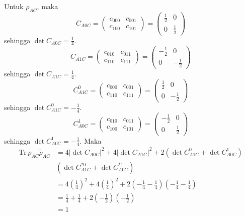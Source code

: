 Untuk $\rho_{AC}$, maka
\begin{equation}
	C_{A0C}=
	\begin{pmatrix}
		c_{000} & c_{001} \\
		c_{100} & c_{101}
	\end{pmatrix}=
	\begin{pmatrix}
		\frac{1}{2} & 0 \\
		0 & \frac{1}{2}
	\end{pmatrix}
\end{equation}
sehingga $\det C_{A0C} = \frac{1}{4}$.
\begin{equation}
	C_{A1C}=
	\begin{pmatrix}
		c_{010} & c_{011} \\
		c_{110} & c_{111}
	\end{pmatrix}=
	\begin{pmatrix}
		-\frac{1}{2} & 0 \\
		0 & -\frac{1}{2}
	\end{pmatrix}
\end{equation}
sehingga $\det C_{A1C} = \frac{1}{4}$.
\begin{equation}
	C_{A1C}^0=
	\begin{pmatrix}
		c_{000} & c_{001} \\
		c_{110} & c_{111}
	\end{pmatrix}=
	\begin{pmatrix}
		\frac{1}{2} & 0 \\
		0 & -\frac{1}{2}
	\end{pmatrix}
\end{equation}
sehingga $\det C_{A1C}^0 = -\frac{1}{4}$.
\begin{equation}
	C_{A0C}^1=
	\begin{pmatrix}
		c_{010} & c_{011} \\
		c_{100} & c_{101}
	\end{pmatrix}=
	\begin{pmatrix}
		-\frac{1}{2} & 0 \\
		0 & \frac{1}{2}
	\end{pmatrix}
\end{equation}
sehingga $\det C_{A0C}^1 = -\frac{1}{4}$. Maka
\begin{equation}
	\begin{aligned}
		\mathrm{Tr}\,\rho_{AC}\tilde{\rho}_{AC}
		&=4|\det C_{A0C}|^2+4|\det C_{A1C}|^2+2(\det C_{A1C}^0+ \det C_{A0C}^1)\\
		&(\det C^{*0}_{A1C} + \det C^{*1}_{A0C})\\
		&=4(\frac{1}{4})^2+4(\frac{1}{4})^2+2(-\frac{1}{4}-\frac{1}{4})(-\frac{1}{4}-\frac{1}{4})\\
		&=\frac{1}{4}+\frac{1}{4}+2(-\frac{1}{2})(-\frac{1}{2})\\
		&=1
	\end{aligned}
\end{equation}
